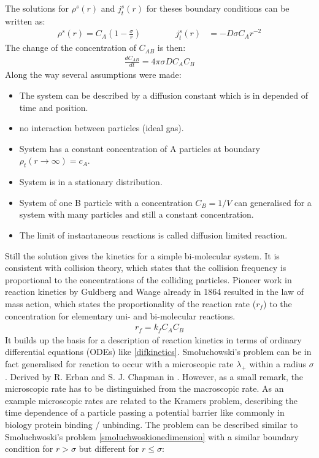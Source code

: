 \documentclass[
  a4paper,BCOR10mm,oneside,
  bibtotoc,idxtotoc,
  headsepline,footsepline,%
  fleqn,openbib
]{scrbook}
\begin{document}
The solutions for $\rho^{s}(r)$ and $j^{s}_t(r)$ for theses boundary conditions can be written as:
\begin{align}
 \rho^{s}(r)=C_A \left(1-\frac{\sigma}{r}\right) \qquad \qquad j^{s}_t(r)&=-D \sigma C_A r^{-2}
 \label{smoluchwoskiproblem}
\end{align}
The change of the concentration of $C_{AB}$ is then: 
\begin{align}
 \frac{d C_{AB} }{dt}=4 \pi \sigma D C_A C_B \label{difkinetics}
\end{align}
Along the way several assumptions were made:
\begin{itemize}
  \item The system can be described by a diffusion constant which is in depended of time and position. 
  \item no interaction between particles (ideal gas).
  \item System has a constant concentration of A particles at boundary $\rho_t(r \rightarrow \infty)=c_A$.
  \item System is in a stationary distribution.
  \item System of one B particle with a concentration $C_B=1/V$ can generalised for a system with many particles and still a constant concentration. 
  \item The limit of instantaneous reactions is called diffusion limited reaction.
\end{itemize}
Still the solution gives the kinetics for a simple bi-molecular system. It is consistent with collision theory, which states that the collision frequency is proportional to the concentrations of the colliding particles. Pioneer work in reaction kinetics by Guldberg and Waage already in 1864 \cite{Waage1986} resulted in the law of mass action, which states the proportionality of the reaction rate ($r_f$) to the concentration for elementary uni- and bi-molecular reactions.
\begin{align}
 r_f=k_f C_A C_B
\end{align}
It builds up the basis for a description of reaction kinetics in terms of ordinary differential equations (ODEs) like \cref{difkinetics}.\newline
Smoluchowski's problem can be in fact generalised for reaction to occur with a microscopic rate $\lambda_{+}$ within a radius $\sigma$. Derived by R. Erban and S. J. Chapman in \cite{Erban2009}.  However, as a small remark, the microscopic rate has to be distinguished from the macroscopic rate. As an example microscopic rates are related to the Kramers problem, describing the time dependence of a particle passing a potential barrier like commonly in biology protein binding / unbinding. The problem can be described similar to Smoluchwoski's problem \cref{smoluchwoskionedimension}  with a similar boundary condition for $r > \sigma$ but different for $r \leq \sigma$:
\end{document}
